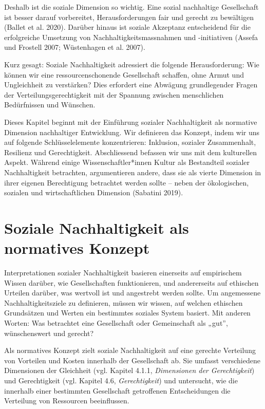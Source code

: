 \documentclass[
  nswissgerman,
  a4paper,
  DIV=11,
  numbers=noendperiod,
  oneside,
  openany]{scrreprt}
\begin{document}
Deshalb ist die soziale Dimension so wichtig. Eine sozial nachhaltige
Gesellschaft ist besser darauf vorbereitet, Herausforderungen fair und
gerecht zu bewältigen (Ballet et al. 2020). Darüber hinaus ist soziale
Akzeptanz entscheidend für die erfolgreiche Umsetzung von
Nachhaltigkeitsmassnahmen und -initiativen (Assefa und Frostell 2007;
Wüstenhagen et al. 2007).

Kurz gesagt: Soziale Nachhaltigkeit adressiert die folgende
Herausforderung: Wie können wir eine ressourcenschonende Gesellschaft
schaffen, ohne Armut und Ungleichheit zu verstärken? Dies erfordert eine
Abwägung grundlegender Fragen der Verteilungsgerechtigkeit mit der
Spannung zwischen menschlichen Bedürfnissen und Wünschen.

Dieses Kapitel beginnt mit der Einführung sozialer Nachhaltigkeit als
normative Dimension nachhaltiger Entwicklung. Wir definieren das
Konzept, indem wir uns auf folgende Schlüsselelemente konzentrieren:
Inklusion, sozialer Zusammenhalt, Resilienz und Gerechtigkeit.
Abschliessend befassen wir uns mit dem kulturellen Aspekt. Während
einige Wissenschaftler*innen Kultur als Bestandteil sozialer
Nachhaltigkeit betrachten, argumentieren andere, dass sie als vierte
Dimension in ihrer eigenen Berechtigung betrachtet werden sollte --
neben der ökologischen, sozialen und wirtschaftlichen Dimension
(Sabatini 2019).

\section{Soziale Nachhaltigkeit als normatives
Konzept}\label{soziale-nachhaltigkeit-als-normatives-konzept}

Interpretationen sozialer Nachhaltigkeit basieren einerseits auf
empirischem Wissen darüber, wie Gesellschaften funktionieren, und
andererseits auf ethischen Urteilen darüber, was wertvoll ist und
angestrebt werden sollte. Um angemessene Nachhaltigkeitsziele zu
definieren, müssen wir wissen, auf welchen ethischen Grundsätzen und
Werten ein bestimmtes soziales System basiert. Mit anderen Worten: Was
betrachtet eine Gesellschaft oder Gemeinschaft als „gut'', wünschenswert
und gerecht?

Als normatives Konzept zielt soziale Nachhaltigkeit auf eine gerechte
Verteilung von Vorteilen und Kosten innerhalb der Gesellschaft ab. Sie
umfasst verschiedene Dimensionen der Gleichheit (vgl. Kapitel 4.1.1,
\emph{Dimensionen der Gerechtigkeit}) und Gerechtigkeit (vgl. Kapitel
4.6, \emph{Gerechtigkeit}) und untersucht, wie die innerhalb einer
bestimmten Gesellschaft getroffenen Entscheidungen die Verteilung von
Ressourcen beeinflussen.
\end{document}
